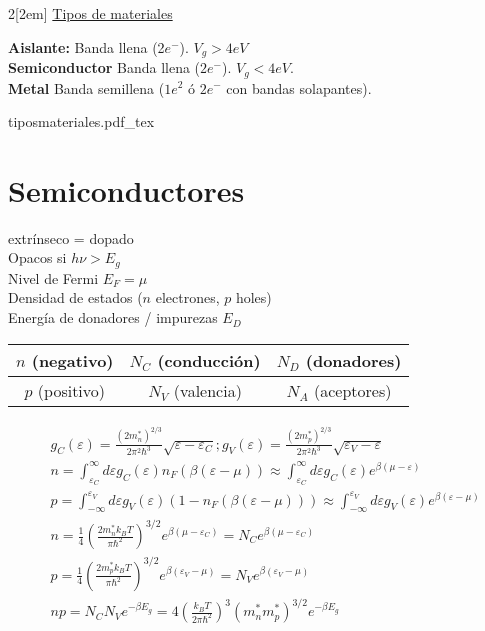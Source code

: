 \documentclass[leqno]{article}
\newcommand{\incfig}[1]{%
\begin{center}
\def\svgwidth{0.9\columnwidth}
{#1.pdf_tex}
\end{center}
}
\begin{document}
\begin{multicols}{2}[\columnsep2em]
\underline{Tipos de materiales}

\textbf{Aislante:} Banda llena (2$e^-$). $V_g>4eV$\\
\textbf{Semiconductor} Banda llena ($2e^-$).  $V_g<4eV$.\\
\textbf{Metal} Banda semillena ($1e^2$ ó $2e^-$ con bandas solapantes).

\incfig{tiposmateriales}

\section{Semiconductores}
extrínseco = dopado\\
Opacos si $h \nu > E_g$\\
Nivel de Fermi $E_F = \mu$\\
Densidad de estados ($n$ electrones, $p$ holes)\\
Energía de donadores / impurezas $E_D$
\begin{center}
\begin{tabular}{c|c|c}
  $n$ (negativo) & $N_C$ (conducción) & $N_D$ (donadores)\\
\hline
  $p$ (positivo) & $N_V$ (valencia) & $N_A$ (aceptores)
\end{tabular}
\end{center}
\begin{align*}
&g_C(\varepsilon ) = \frac{(2m^*_n) ^{2 /3}}{2\pi ^2\hbar ^3}\sqrt{\varepsilon -\varepsilon _C} ; 
g_V(\varepsilon ) = \frac{(2m^*_p) ^{2 /3}}{2\pi ^2\hbar ^3}\sqrt{\varepsilon _V-\varepsilon } \\
& n = \int_{\varepsilon _C}^\infty d\varepsilon g_C(\varepsilon )n_F(\beta (\varepsilon -\mu ))\approx \int _{\varepsilon _C}^\infty d\varepsilon g_C(\varepsilon ) e ^{\beta (\mu -\varepsilon )}\\
& p = \int^{\varepsilon _V}_{-\infty} d\varepsilon g_V(\varepsilon )(1-n_F(\beta (\varepsilon -\mu )))\approx \int ^{\varepsilon _V}_{-\infty} d\varepsilon g_V(\varepsilon ) e ^{\beta (\varepsilon-\mu )}\\
&n = \frac{1}{4}\left(\frac{2 m^*_nk_BT}{\pi \hbar ^2}\right)^{3 /2} e ^{\beta(\mu -\varepsilon _C)} = N_C e ^{\beta (\mu -\varepsilon _C)}\\
&p = \frac{1}{4}\left(\frac{2 m^*_pk_BT}{\pi \hbar ^2}\right)^{3 /2} e ^{\beta(\varepsilon _V-\mu )} = N_V e ^{\beta (\varepsilon _V-\mu )}\\
& np = N_CN_V e ^{-\beta E_g} = 4 \left(\frac{k_BT}{2\pi \hbar ^2}\right)^3(m_n^*m_p^*)^{3 / 2}e ^{-\beta E_g}\\

\end{align*}
\end{multicols}
\end{document}
